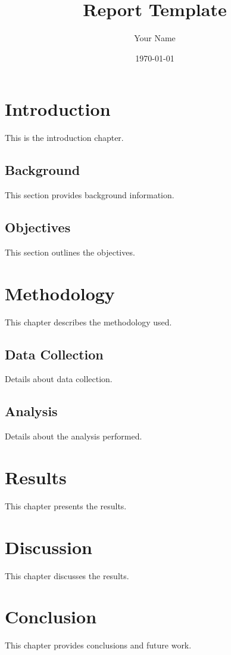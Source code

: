 \documentclass{report}
\title{Report Template}
\author{Your Name}
\date{\today}
\begin{document}
\maketitle

\tableofcontents
\newpage

\chapter{Introduction}

This is the introduction chapter.

\section{Background}

This section provides background information.

\section{Objectives}

This section outlines the objectives.

\chapter{Methodology}

This chapter describes the methodology used.

\section{Data Collection}

Details about data collection.

\section{Analysis}

Details about the analysis performed.

\chapter{Results}

This chapter presents the results.

\chapter{Discussion}

This chapter discusses the results.

\chapter{Conclusion}

This chapter provides conclusions and future work.
\end{document}
